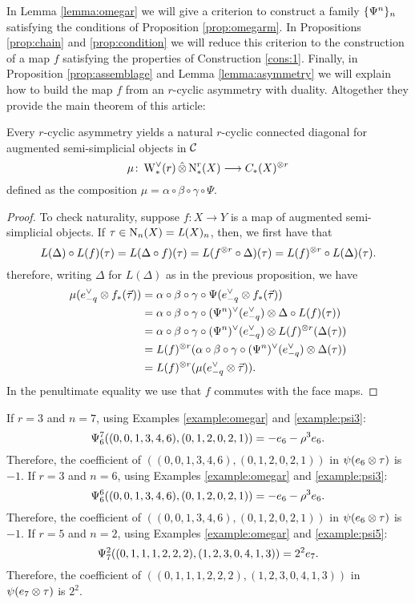In Lemma \ref{lemma:omegar} we will give a criterion to construct a family $\{\Psiom^n\}_n$ satisfying the conditions of Proposition \ref{prop:omegarm}. In Propositions \ref{prop:chain} and \ref{prop:condition} we will reduce this criterion to the construction of a map $f$ satisfying the properties of Construction \ref{cons:1}. Finally, in Proposition \ref{prop:assemblage} and Lemma \ref{lemma:asymmetry} we will explain how to build the map $f$ from an $r$-cyclic asymmetry with duality. Altogether they provide the main theorem of this article:

\begin{theorem}\label{thm2:mainthm} Every $r$-cyclic asymmetry yields a natural $r$-cyclic connected diagonal for augmented semi-simplicial objects in $\cC$
\[
	\mu \colon \rWd(r) \hotimes \rchains(X) \lra \ucadenas(X)^{\ot r}
\]
defined as the composition
	$
	\mu = \alpha\circ\beta\circ\gamma\circ \Psi.
	$
\end{theorem}

\begin{proof}
	To check naturality, suppose $f \colon X \to Y$ is a map of augmented semi-simplicial objects. If $\tau\in \chains[n](X) = \abel(X)_n$, then, we first have that
	\[
		L(\Delta)\circ L(f)(\tau) = L(\Delta\circ f)(\tau) = L(f^{\ot r}\circ \Delta)(\tau) = L(f)^{\ot r}\circ L(\Delta)(\tau).
	\]
	therefore, writing $\Delta$ for $L(\Delta)$ as in the previous proposition, we have
	\begin{align*}
	\mu(e^\dd_{-q} \ot f_*(\vec{\tau}))
		&=	\alpha\circ\beta\circ\gamma\circ \Psi(e_{-q}^\vee \ot f_*(\vec{\tau}))
		\\
		&= \alpha\circ\beta\circ\gamma\circ(\Psiom^n)^\vee(e_{-q}^\vee) \ot \Delta\circ L(f)(\tau))
		\\
		&= \alpha\circ\beta\circ\gamma\circ(\Psiom^n)^\vee(e_{-q}^\vee) \ot L(f)^{\ot r}(\Delta(\tau))
		\\
		&= L(f)^{\ot r}(\alpha\circ\beta\circ\gamma\circ(\Psiom^n)^\vee(e_{-q}^\vee) \ot \Delta(\tau))
		\\
		&= L(f)^{\ot r}(\mu(e^\dd_{-q} \ot \vec{\tau})).
	\end{align*}
	In the penultimate equality we use that $f$ commutes with the face maps.
\end{proof}

\begin{example}\label{ex:omegarn} If $r=3$ and $n=7$, using Examples \ref{example:omegar} and \ref{example:psi3}:
	\[
		\Psiom_6^7((0,0,1,3,4,6),(0,1,2,0,2,1)) = -e_6-\rho^3e_6.
	\]
	Therefore, the coefficient of $((0,0,1,3,4,6),(0,1,2,0,2,1))$ in $\psi(e_6 \ot \tau)$ is $-1$.
 If $r=3$ and $n=6$, using Examples \ref{example:omegar} and \ref{example:psi3}:
	\[
		\Psiom_6^6((0,0,1,3,4,6),(0,1,2,0,2,1)) = -e_6-\rho^3e_6.
	\]
	Therefore, the coefficient of $((0,0,1,3,4,6),(0,1,2,0,2,1))$ in $\psi(e_6 \ot \tau)$ is $-1$.
 If $r=5$ and $n=2$, using Examples \ref{example:omegar} and \ref{example:psi5}:
	\[
		\Psiom_7^2((0,1,1,1,2,2,2),(1,2,3,0,4,1,3)) = 2^2e_7.
	\]
Therefore, the coefficient of $((0,1,1,1,2,2,2),(1,2,3,0,4,1,3))$ in $\psi(e_7 \ot \tau)$ is $2^2$.
\end{example}

